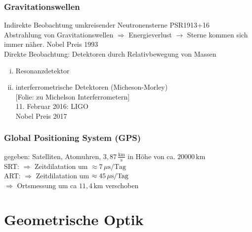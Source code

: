 \documentclass[titlepage,11pt,a4paper,ngerman]{report}
\newcommand{\tx}[1]{\textrm{#1}}
\newcommand{\folie}[1]{\color{gray}[Folie: #1]\color{black}}
\begin{document}
\subsection{Gravitationswellen}
Indirekte Beobachtung umkreisender Neutronensterne PSR1913+16\\
Abstrahlung von Gravitationswellen $ \Rightarrow $ Energieverlust $ \rightarrow $ Sterne kommen sich immer näher. Nobel Preis 1993\\[5pt]
Direkte Beobachtung: Detektoren durch Relativbewegung von Massen
\begin{enumerate}[(i)]
	\item Resonanzdetektor
	\item interferrometrische Detektoren (Micheson-Morley)\\
	\folie{zu Michelson Interferrometern}\\
	11. Februar 2016: LIGO\\
	Nobel Preis 2017
\end{enumerate}

\subsection{Global Positioning System (GPS)}
gegeben: Satelliten, Atomuhren, $ 3{,}87 \, \frac{\tx{km}}{\tx{s}} $ in Höhe von ca. $ 20000 \, \tx{km} $\\[5pt]
SRT: $ \Rightarrow $ Zeitdilatation um $ \approx 7 \, \mu \tx{s} / \tx{Tag} $\\
ART: $ \Rightarrow $ Zeitdilatation um $ \approx 45 \, \mu \tx{s/\tx{Tag}} $\\[5pt]
$ \Rightarrow $ Ortsmessung um ca $ 11{,}4 \, \tx{km} $ verschoben


 
 
\chapter{Geometrische Optik}
\end{document}
